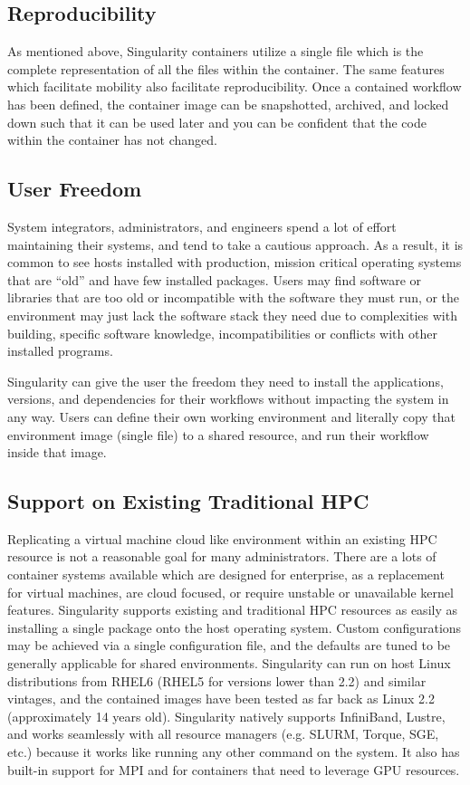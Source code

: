 \documentclass[letterpaper,10pt,english]{sphinxmanual}
\begin{document}
\subsection{Reproducibility}
\label{\detokenize{introduction:reproducibility}}
As mentioned above, Singularity containers utilize a single file which is the complete
representation of all the files within the container. The same
features which facilitate mobility also facilitate reproducibility.
Once a contained workflow has been defined, the container image can be
snapshotted, archived, and locked down such that it can be used later
and you can be confident that the code within the container has not
changed.


\subsection{User Freedom}
\label{\detokenize{introduction:user-freedom}}
System integrators, administrators, and engineers spend a lot
of effort maintaining their systems, and tend to take a cautious
approach. As a result, it is common to see hosts installed with
production, mission critical operating systems that are “old” and have
few installed packages. Users may find software or libraries that are
too old or incompatible with the software they must run, or the
environment may just lack the software stack they need due to
complexities with building, specific software knowledge,
incompatibilities or conflicts with other installed programs.

Singularity can give the user the freedom they need to install the
applications, versions, and dependencies for their workflows without
impacting the system in any way. Users can define their own working
environment and literally copy that environment image (single file) to
a shared resource, and run their workflow inside that image.


\subsection{Support on Existing Traditional HPC}
\label{\detokenize{introduction:support-on-existing-traditional-hpc}}
Replicating a virtual machine cloud like environment within an
existing HPC resource is not a reasonable goal for many
administrators. There are a lots of container systems available which
are designed for enterprise, as a replacement for virtual machines,
are cloud focused, or require unstable or unavailable kernel features.
Singularity supports existing and traditional HPC resources as easily
as installing a single package onto the host operating system. Custom
configurations may be achieved via a single configuration file, and
the defaults are tuned to be generally applicable for shared
environments.
Singularity can run on host Linux distributions from RHEL6 (RHEL5 for
versions lower than 2.2) and similar vintages, and the contained
images have been tested as far back as Linux 2.2 (approximately 14
years old). Singularity natively supports InfiniBand, Lustre, and
works seamlessly with all resource managers (e.g. SLURM, Torque, SGE,
etc.) because it works like running any other command on the system.
It also has built-in support for MPI and for containers that need to
leverage GPU resources.
\end{document}
